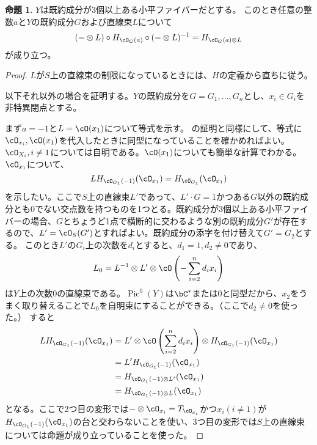 \documentclass[uplatex, a4paper, dvipdfmx]{jsarticle}
\theoremstyle{definition}
\newtheorem{proposition}[theorem]{命題}
\DeclareMathOperator{\Pic}{\mathrm{Pic}}
\begin{document}
\begin{proposition}
    $Y$は既約成分が3個以上ある小平ファイバーだとする。
    このとき任意の整数$a$と$Y$の既約成分$G$および直線束$L$について
    \begin{equation}
        (-\otimes L) \circ H_{\cO_G(a)} \circ(- \otimes L)^{-1} = H_{\cO_G(a)\otimes L}
    \end{equation}
    が成り立つ。
\end{proposition}
\begin{proof}
    $L$が$S$上の直線束の制限になっているときには、$H$の定義から直ちに従う。

    以下それ以外の場合を証明する。$Y$の既約成分を$G = G_1, \dots, G_n$とし、$x_i \in G_i$を非特異閉点とする。

    まず$a=-1$と$L = \cO(x_1)$について等式を示す。
    \cite[Lemma 3.3]{MR3182005}の証明と同様にして、等式に$\cO_{x_i}, \cO(x_1)$を代入したときに同型になっていることを確かめればよい。
    $\cO_{X_i}, i \neq 1$については自明である。$\cO(x_1)$についても簡単な計算でわかる。
    $\cO_{x_1}$について、
    \begin{equation}
        LH_{\cO_{G_1}(-1)}(\cO_{x_1}) = H_{\cO_{G_1}}(\cO_{x_1})
    \end{equation}
    を示したい。ここで$S$上の直線束$L'$であって、$L' \cdot G = 1$かつある$G$以外の既約成分とも$0$でない交点数を持つものを1つとる。既約成分が3個以上ある小平ファイバーの場合、$G$とちょうど1点で横断的に交わるような別の既約成分$G'$が存在するので、$L' = \cO_S(G')$とすればよい。既約成分の添字を付け替えて$G' = G_2$とする。
    このとき$L'$の$G_i$上の次数を$d_i$とすると、$d_1 = 1, d_2 \neq 0$であり、
    \begin{equation}
        L_0=L^{-1} \otimes L' \otimes \cO\left(-\sum_{i = 2}^n d_ix_i\right)
    \end{equation}
    は$Y$上の次数$0$の直線束である。$\Pic^0(Y)$は$\bC^*$または$0$と同型だから、$x_2$をうまく取り替えることで$L_0$を自明束にすることができる。（ここで$d_2 \neq 0$を使った。）
    すると
    \begin{align}
        LH_{\cO_{G_1}(-1)}(\cO_{x_1}) & = L' \otimes\cO\left(\sum_{i = 2}^n d_ix_i\right)\otimes H_{\cO_{G_1}(-1)}(\cO_{x_1}) \\
                                      & =L' H_{\cO_{G_1}(-1)}(\cO_{x_1})                                                      \\
                                      & = H_{\cO_{G_1}(-1)\otimes L'}(\cO_{x_1})                                              \\
                                      & =H_{\cO_{G_1}(-1)\otimes L}(\cO_{x_1})
    \end{align}
    となる。ここで2つ目の変形では$-\otimes \cO_{x_i} = T_{\cO_{x_i}}$かつ$x_i (i \neq 1)$が$H_{\cO_{G_1}(-1)}(\cO_{x_1})$の台と交わらないことを使い、3つ目の変形では$S$上の直線束については命題が成り立っていることを使った。


\end{proof}
\end{document}
